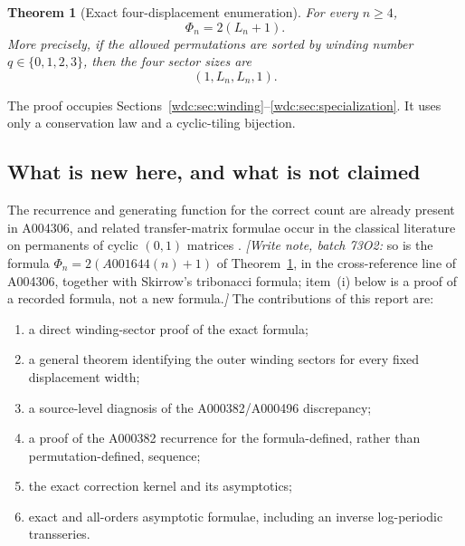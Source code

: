 \documentclass[11pt,letterpaper]{article}
\numberwithin{equation}{section}
\newtheorem{theorem}{Theorem}[section]
\theoremstyle{definition}
\begin{document}
\begin{theorem}[Exact four-displacement enumeration]\label{wdc:thm:main}
For every $n\ge4$,
\begin{equation}\label{wdc:eq:main-formula}
  \boxed{\Phi_n=2(L_n+1).}
\end{equation}
More precisely, if the allowed permutations are sorted by winding number
$q\in\{0,1,2,3\}$, then the four sector sizes are
\begin{equation}\label{wdc:eq:sector-vector}
  (1,L_n,L_n,1).
\end{equation}
\end{theorem}

The proof occupies Sections~\ref{wdc:sec:winding}--\ref{wdc:sec:specialization}.
It uses only a conservation law and a cyclic-tiling bijection.

\subsection{What is new here, and what is not claimed}\label{wdc:sec:new}

The recurrence and generating function for the correct count are already
present in A004306, and related transfer-matrix formulae occur in the classical
literature on permanents of cyclic $(0,1)$ matrices
\cite{metropolis1969,beker1987}.  \emph{[Write note, batch 73O2:} so is the
formula $\Phi_n=2(A001644(n)+1)$ of Theorem~\ref{wdc:thm:main}, in the
cross-reference line of A004306, together with Skirrow's tribonacci formula;
item~(i) below is a proof of a recorded formula, not a new formula.\emph{]}
The contributions of this report are:

\begin{enumerate}[label=(\roman*),leftmargin=2.4em]
\item a direct winding-sector proof of the exact formula;
\item a general theorem identifying the outer winding sectors for every fixed
      displacement width;
\item a source-level diagnosis of the A000382/A000496 discrepancy;
\item a proof of the A000382 recurrence for the formula-defined, rather than
      permutation-defined, sequence;
\item the exact correction kernel and its asymptotics;
\item exact and all-orders asymptotic formulae, including an inverse
      log-periodic transseries.
\end{enumerate}
\end{document}
